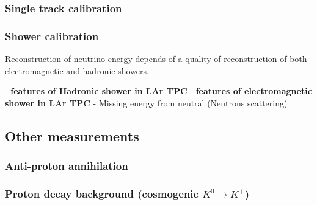 \subsubsection{Single track calibration}

\subsubsection{Shower calibration}

Reconstruction of neutrino energy depends of a quality of reconstruction of both electromagnetic and hadronic showers. 

- {\bf features of Hadronic shower in LAr TPC}
- {\bf features of electromagnetic shower in LAr TPC}
- Missing energy from neutral (Neutrons scattering)
 

\subsection{Other measurements} 
\subsubsection{Anti-proton annihilation }
\subsubsection{Proton decay background (cosmogenic $K^{0} \to K^+$)}



